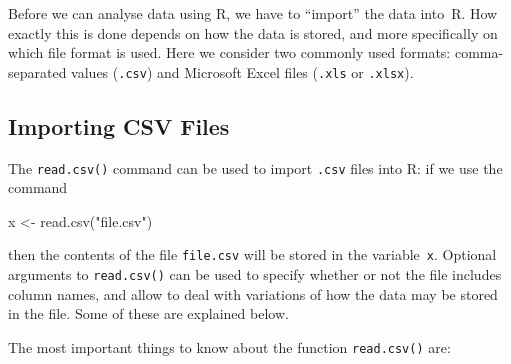 \documentclass[
  a4paper,
]{article}
\newenvironment{Shaded}{\begin{snugshade}}{\end{snugshade}}
\newcommand{\FunctionTok}[1]{\textcolor[rgb]{0.00,0.00,0.00}{#1}}
\newcommand{\NormalTok}[1]{#1}
\newcommand{\OtherTok}[1]{\textcolor[rgb]{0.56,0.35,0.01}{#1}}
\newcommand{\StringTok}[1]{\textcolor[rgb]{0.31,0.60,0.02}{#1}}
\theoremstyle{definition}
\theoremstyle{definition}
\theoremstyle{definition}
\theoremstyle{definition}
\theoremstyle{remark}
\begin{document}
Before we can analyse data using R, we have to ``import'' the data
into~R. How exactly this is done depends on how the data is stored,
and more specifically on which file format is used. Here we consider
two commonly used formats: comma-separated values (\texttt{.csv})
and Microsoft Excel files (\texttt{.xls} or \texttt{.xlsx}).

\hypertarget{importing-csv-files}{%
\subsection*{Importing CSV Files}\label{importing-csv-files}}

The \texttt{read.csv()} command can be used to import \texttt{.csv} files
into R: if we use the command

\begin{Shaded}
\begin{Highlighting}[]
\NormalTok{  x }\OtherTok{\textless{}{-}} \FunctionTok{read.csv}\NormalTok{(}\StringTok{"file.csv"}\NormalTok{)}
\end{Highlighting}
\end{Shaded}

then the contents of the file \texttt{file.csv} will be stored in the variable~\texttt{x}.
Optional arguments to \texttt{read.csv()} can be used to specify whether or not the
file includes column names, and allow to deal with variations of how the data
may be stored in the file. Some of these are explained below.

The most important things to
know about the function \texttt{read.csv()} are:
\end{document}
